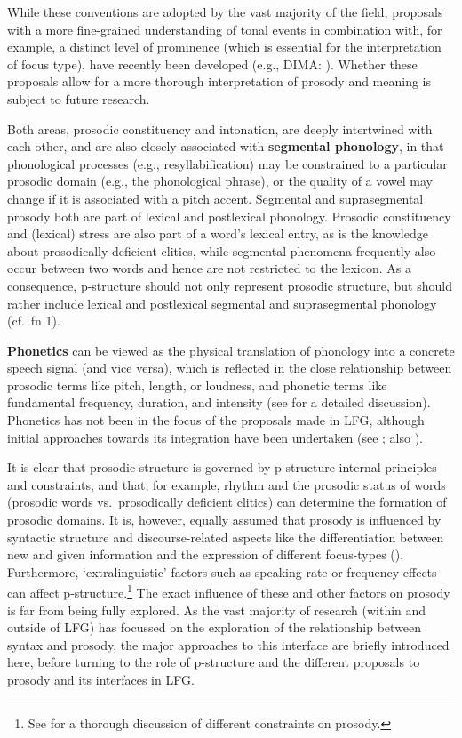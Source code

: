 \documentclass[output=paper,hidelinks]{langscibook}
\begin{document}
\noindent While these conventions are adopted by the vast majority of the field, proposals with a more fine-grained understanding of tonal events in combination with, for example, a distinct level of prominence  (which is essential for the interpretation of focus type), have recently been developed (e.g., DIMA:  \citealt{DIMA}). Whether these proposals allow for a more thorough interpretation of prosody and meaning is subject to future research.


Both areas, prosodic constituency and intonation, are deeply intertwined with each other, and are also closely associated with {\bf segmental phonology}, in that phonological processes (e.g., resyllabification) may be constrained to a particular prosodic domain (e.g., the phonological phrase), or the quality of a vowel may change if it is associated with a pitch accent. 
Segmental and suprasegmental prosody both are part of lexical and postlexical phonology.  
Prosodic constituency and (lexical) stress are also part of a word's lexical entry, as is the knowledge about prosodically deficient clitics, while segmental phenomena frequently also occur between two words and hence are not restricted to the lexicon. As a consequence, p-structure should not only represent prosodic structure, but should rather include  lexical and postlexical segmental and suprasegmental phonology (cf.~fn 1).

{\bf Phonetics} can be viewed as the physical translation of phonology into a concrete speech signal (and vice versa), which is reflected in the close relationship between prosodic terms like pitch, length, or loudness, and phonetic terms like fundamental frequency, duration, and intensity (see \citealt{Kingston2019} for a detailed discussion). Phonetics has not been in the focus of the proposals made in LFG, although initial approaches towards its integration have been undertaken (see \citealt{Buttetal2020, Boegel2020}; also ).

It is clear that prosodic structure is governed by p-structure internal principles and constraints, and that, for example, rhythm and the prosodic status of words (prosodic words vs.~prosodically deficient clitics) can determine the formation of prosodic domains. It is, however, equally assumed that prosody is influenced by syntactic structure and discourse-related aspects like the differentiation between new and given information and the expression of different focus-types  ().
Furthermore, `extralinguistic' factors such as speaking rate or frequency effects can affect p-structure.\footnote{See \citet{Shattuck-HufnagelTurk1996} for a thorough discussion of different constraints on prosody.} The exact influence of these and other factors on prosody is far from being fully explored. As the vast majority of research (within and outside of LFG) has focussed on the exploration of the relationship between syntax and prosody, the major approaches to this interface are briefly introduced here, before turning to the role of p-structure and the different proposals to prosody and its interfaces in LFG.
\end{document}
